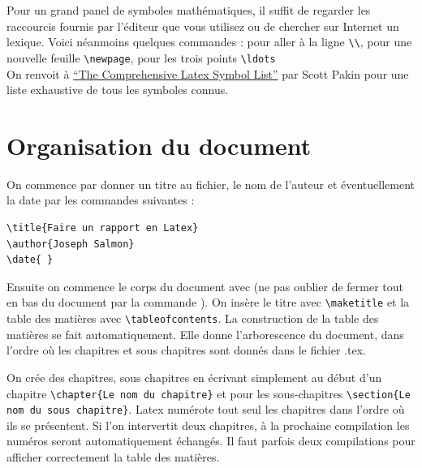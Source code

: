 Pour un grand panel de symboles mathématiques, il suffit de regarder les raccourcis fournis par l'éditeur 
que vous utilisez ou de chercher sur Internet un lexique. Voici néanmoins quelques commandes : 
pour aller à la ligne  \lstinline+\\+, 
pour une nouvelle feuille \lstinline+\newpage+, pour les trois points  \lstinline+\ldots+\medskip
\\
On renvoit à \href{http://www.tex.ac.uk/tex-archive/info/symbols/comprehensive/symbols-a4.pdf}
{``The Comprehensive Latex Symbol List''} par Scott Pakin pour une liste exhaustive de tous les
 symboles connus.


\section{Organisation du document}


On commence par donner un titre au  fichier, le nom de l'auteur et éventuellement la date par les
 commandes suivantes :\medskip

\begin{lstlisting}
\title{Faire un rapport en Latex} 
\author{Joseph Salmon} 
\date{ }
\end{lstlisting}



Ensuite on commence le corps du document avec \lstinline++ 
(ne pas oublier de fermer tout en bas du document par la commande \lstinline++). 
On insère le titre avec \lstinline+\maketitle+ et la table des matières avec \lstinline+\tableofcontents+.
La construction de la table des matières se fait automatiquement. 
Elle donne l'arborescence du document, dans l'ordre où les chapitres et sous chapitres sont donnés 
dans le fichier .tex.\medskip	


On crée  des chapitres, sous chapitres en écrivant simplement  au début d'un chapitre 
\lstinline+\chapter{Le nom du chapitre}+ 
et pour les sous-chapitres \lstinline+\section{Le nom du sous chapitre}+.  
Latex numérote tout seul les chapitres dans l'ordre où ils se présentent. 
Si l'on intervertit deux chapitres, à la prochaine compilation les numéros seront automatiquement 
échangés. Il faut parfois deux compilations pour afficher correctement la table des matières.  \medskip
 
